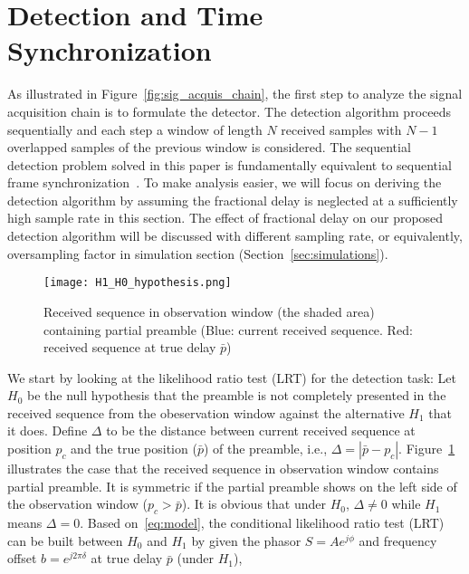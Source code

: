 \section{Detection and Time Synchronization}
\label{sec:detection}

As illustrated in Figure~\ref{fig:sig_acquis_chain}, the first step to analyze
the signal acquisition chain is to formulate the detector.
The detection algorithm proceeds sequentially and each step a window of length $N$ received samples with 
$N{-}1$ overlapped samples of the previous window is considered. The sequential detection problem solved 
in this paper is fundamentally equivalent to sequential frame synchronization~\cite{Massey_72,Lui_Tan_86,Scholtz_80}.
To make analysis easier, we will focus on deriving the detection algorithm   
by assuming the fractional delay is neglected at a sufficiently high sample rate in this section.
The effect of fractional delay on our proposed detection algorithm will be discussed with different sampling rate, or equivalently, 
oversampling factor in simulation section (Section~\ref{sec:simulations}). 

\begin{figure}[t]
  \centerline{\texttt{[image: H1\_H0\_hypothesis.png]}}
  \caption{Received sequence in observation window (the shaded area) containing partial preamble (Blue: current received sequence. Red: received sequence at true delay $\bar{p}$)}
  \label{fig:H1_H0_hypothesis}
  \end{figure}

We start by looking at the likelihood ratio test (LRT) for the detection task:
Let $H_0$ be the null hypothesis that the preamble is not completely presented in the received sequence from the obeservation window 
against the alternative $H_1$ that it does. 
Define $\Delta$ to be the distance between current received sequence at position $p_c$ and the true position ($\bar{p}$) of the preamble, 
i.e., $\Delta=|\bar{p}-p_c|$. Figure~\ref{fig:H1_H0_hypothesis} illustrates the case that the received sequence in observation window contains partial preamble.
It is symmetric if the partial preamble shows on the left side of the observation window ($p_c>\bar{p}$).
It is obvious that under $H_0$, $\Delta \neq 0$ while $H_1$ means $\Delta=0$. 
Based on~\eqref{eq:model}, the conditional likelihood ratio test (LRT) can be built 
between $H_0$ and $H_1$ by given the phasor $S{=}Ae^{j\phi}$ and frequency offset $b{=}e^{j2\pi \delta}$
at true delay $\bar{p}$ (under $H_1$),

